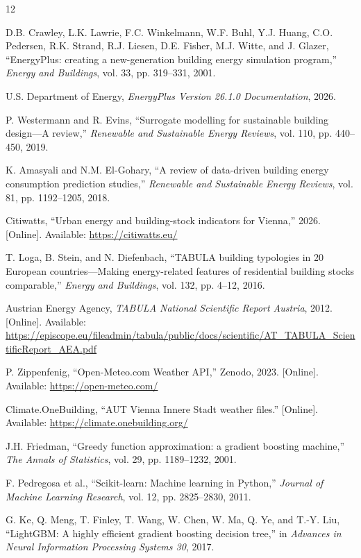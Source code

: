 \documentclass[10pt,twocolumn]{article}
\begin{document}
\balance
\begin{thebibliography}{12}

D.B. Crawley, L.K. Lawrie, F.C. Winkelmann, W.F. Buhl, Y.J. Huang,
C.O. Pedersen, R.K. Strand, R.J. Liesen, D.E. Fisher, M.J. Witte, and
J. Glazer, ``EnergyPlus: creating a new-generation building energy simulation
program,'' \emph{Energy and Buildings}, vol. 33, pp. 319--331, 2001.

U.S. Department of Energy, \emph{EnergyPlus Version 26.1.0 Documentation},
2026.

P. Westermann and R. Evins, ``Surrogate modelling for sustainable building
design---A review,'' \emph{Renewable and Sustainable Energy Reviews},
vol. 110, pp. 440--450, 2019.

K. Amasyali and N.M. El-Gohary, ``A review of data-driven building energy
consumption prediction studies,'' \emph{Renewable and Sustainable Energy
Reviews}, vol. 81, pp. 1192--1205, 2018.

Citiwatts, ``Urban energy and building-stock indicators for Vienna,'' 2026.
[Online]. Available: \url{https://citiwatts.eu/}

T. Loga, B. Stein, and N. Diefenbach, ``TABULA building typologies in 20
European countries---Making energy-related features of residential building
stocks comparable,'' \emph{Energy and Buildings}, vol. 132, pp. 4--12, 2016.

Austrian Energy Agency, \emph{TABULA National Scientific Report Austria},
2012. [Online]. Available:
\url{https://episcope.eu/fileadmin/tabula/public/docs/scientific/AT_TABULA_ScientificReport_AEA.pdf}

P. Zippenfenig, ``Open-Meteo.com Weather API,'' Zenodo, 2023. [Online].
Available: \url{https://open-meteo.com/}

Climate.OneBuilding, ``AUT Vienna Innere Stadt weather files.'' [Online].
Available: \url{https://climate.onebuilding.org/}

J.H. Friedman, ``Greedy function approximation: a gradient boosting machine,''
\emph{The Annals of Statistics}, vol. 29, pp. 1189--1232, 2001.

F. Pedregosa et al., ``Scikit-learn: Machine learning in Python,''
\emph{Journal of Machine Learning Research}, vol. 12, pp. 2825--2830, 2011.

G. Ke, Q. Meng, T. Finley, T. Wang, W. Chen, W. Ma, Q. Ye, and T.-Y. Liu,
``LightGBM: A highly efficient gradient boosting decision tree,'' in
\emph{Advances in Neural Information Processing Systems 30}, 2017.

\end{thebibliography}
\end{document}
